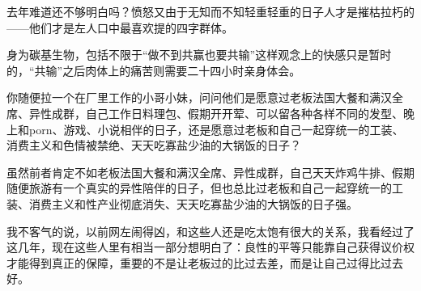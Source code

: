 \begin{zhihuanswer}
去年难道还不够明白吗？愤怒又由于无知而不知轻重轻重的日子人才是摧枯拉朽的------他们才是左人口中最喜欢提的四字群体。

身为碳基生物，包括不限于``做不到共赢也要共输''这样观念上的快感只是暂时的，``共输''之后肉体上的痛苦则需要二十四小时亲身体会。

你随便拉一个在厂里工作的小哥小妹，问问他们是愿意过老板法国大餐和满汉全席、异性成群，自己工作日料理包、假期开开荤、可以留各种各样不同的发型、晚上和porn、游戏、小说相伴的日子，还是愿意过老板和自己一起穿统一的工装、消费主义和色情被禁绝、天天吃寡盐少油的大锅饭的日子？

虽然前者肯定不如老板法国大餐和满汉全席、异性成群，自己天天炸鸡牛排、假期随便旅游有一个真实的异性陪伴的日子，但也总比过老板和自己一起穿统一的工装、消费主义和性产业彻底消失、天天吃寡盐少油的大锅饭的日子强。

我不客气的说，以前网左闹得凶，和这些人还是吃太饱有很大的关系，我看经过了这几年，现在这些人里有相当一部分想明白了：良性的平等只能靠自己获得议价权才能得到真正的保障，重要的不是让老板过的比过去差，而是让自己过得比过去好。
\end{zhihuanswer}
